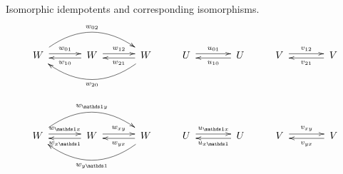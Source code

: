 \begin{table}
{{
}
}
\caption{Minimal idempotents for $\tube_{x \to x}$. 
We have used the notation $t_x =t_{x\unit xx; 11}$, $v_x = \text{id}_x \in \tube_{x \to x}$, $X_{ij} = t_{xxx; ij}$, $v_x l_y = t_{xxxy; 11}$, and $t_x h_y = t_{xyxx; 11}$. 
\label{mor1to1}}
\end{table}

Isomorphic idempotents and corresponding isomorphisms.
\begin{align}
\xymatrix @!0 @M=2mm @R=22mm @C=19mm{
W \ar@/^2pc/[rr]^{w_{02}} \ar@<.5ex>[r]^{w_{01}}
& W \ar@<.5ex>[l]^{w_{10}} \ar@<.5ex>[r]^{w_{12}}
& W\ar@<.5ex>[l]^{w_{21}} \ar@/^2pc/[ll]^{w_{20}}
}\qquad
\xymatrix @!0 @M=2mm @R=22mm @C=19mm{
U\ar@<.5ex>[r]^{u_{01}}
& U \ar@<.5ex>[l]^{u_{10}} 
}\qquad
\xymatrix @!0 @M=2mm @R=22mm @C=19mm{
V\ar@<.5ex>[r]^{v_{12}}
& V \ar@<.5ex>[l]^{v_{21}} 
}
\end{align}


\begin{align}
\xymatrix @!0 @M=2mm @R=22mm @C=19mm{
W \ar@/^2pc/[rr]^{w_{\unit y }} \ar@<.5ex>[r]^{w_{\unit x}}
& W \ar@<.5ex>[l]^{w_{x \unit }} \ar@<.5ex>[r]^{w_{xy}}
& W\ar@<.5ex>[l]^{w_{yx}} \ar@/^2pc/[ll]^{w_{y\unit}}
}\qquad
\xymatrix @!0 @M=2mm @R=22mm @C=19mm{
U\ar@<.5ex>[r]^{u_{\unit x}}
& U \ar@<.5ex>[l]^{u_{x \unit}} 
}\qquad
\xymatrix @!0 @M=2mm @R=22mm @C=19mm{
V\ar@<.5ex>[r]^{v_{xy}}
& V \ar@<.5ex>[l]^{v_{yx}} 
}
\end{align}



